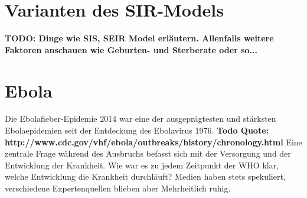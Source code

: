 \begin{refsection}
\section{Varianten des SIR-Models}

\textbf{TODO: Dinge wie SIS, SEIR Model erläutern. Allenfalls weitere Faktoren anschauen wie Geburten- und Sterberate oder so...}

\section{Ebola}
Die Ebolafieber-Epidemie 2014  war eine der ausgeprägtesten und stärksten Ebolaepidemien seit der Entdeckung des Ebolavirus 1976. \textbf{Todo Quote: http://www.cdc.gov/vhf/ebola/outbreaks/history/chronology.html} Eine zentrale Frage während des Ausbruchs befasst sich mit der Versorgung und der Entwicklung der Krankheit. Wie war es zu jedem Zeitpunkt der WHO klar, welche Entwicklung die Krankheit durchläuft? Medien haben stets spekuliert, verschiedene Expertenquellen blieben aber Mehrheitlich ruhig. \\


\end{refsection}
